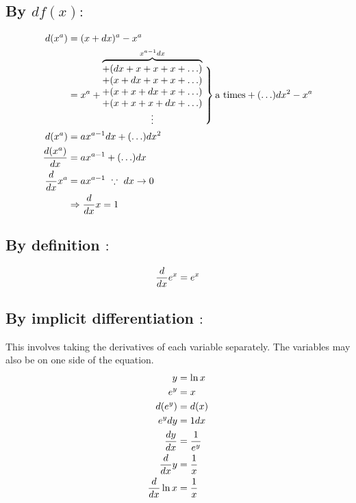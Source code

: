 \documentclass[a4paper,14pt,twoside]{book}
\begin{document}
{\subsection{By $df(x):$}
\begin{align*}
	d(x^a)        & = (x+dx)^a - x^a               \\
	              & = x^a
	+ \overbrace{\begin{matrix}
			+ (dx + x + x + x + \ldots) \\
			+ (x + dx + x + x + \ldots) \\
			+ (x + x + dx + x + \ldots) \\
			+ (x + x + x + dx + \ldots) \\
			\vdots
		\end{matrix}}^{x^{a-1}dx}
	\left. \phantom{\begin{matrix} \\ \\ \\ \\ \\ \end{matrix}} \right\}
	\T{a times}
	+ (\ldots)dx^2
	- x^a                                          \\
	d(x^a)        & = ax^{a-1}dx + (\ldots)dx^2    \\
	\DD{(x^a)}{x} & = ax^{a-1} + (\ldots)dx        \\
	\D x^a        & = ax^{a-1}\ \because\ dx \to 0 \\
	              & \Rightarrow \D x = 1
\end{align*}
\subsection{By definition $:$}
\begin{align*}
	\frac{d}{dx} e^x = e^x
\end{align*}
\subsection{By implicit differentiation $:$}
This involves taking the derivatives of each variable separately.
The variables may also be on one side of the equation.
\begin{align*}
	y           & = \ln{x}     \\
	e^y         & = x          \\
	d(e^y)      & = d(x)       \\
	e^y dy      & = 1dx        \\
	\frac{dy}{dx}  & = \frac{1}{e^y} \\
	\frac{d}{dx} y & = \frac{1}{x}   \\
	\frac{d}{dx} \ln{x}   & = \frac{1}{x}
\end{align*}
}
\end{document}
